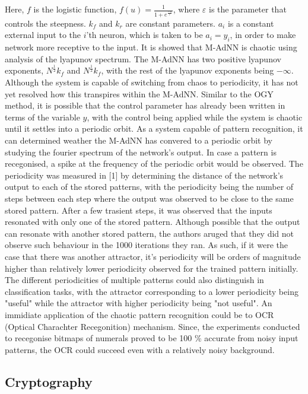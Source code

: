 \documentclass[12pt, letterpaper]{article}
\begin{document}
Here, $f$ is the logistic function, $f(u) = \frac{1}{1 + e^\frac{-u}{\varepsilon}}$, where $\varepsilon$ is the parameter that controls the steepness. $k_f$ and $k_r$ are constant parameters. $a_i$ is a constant external input to the $i$'th neuron, which is taken to be $a_i = y_i$, in order to make network more receptive to the input.
It is showed that M-AdNN is chaotic using analysis of the lyapunov spectrum. The M-AdNN has two positive lyapunov exponents, $N^{\frac{1}{2}}k_f$ and $N^{\frac{1}{2}}k_f$, with the rest of the lyapunov exponents being $-\infty$. Although the system is capable of switching from chaos to periodicity, it has not yet resolved how this transpires within the M-AdNN. Similar to the OGY method, it is possible that the control parameter has already been written in terms of the variable $y$, with the control being applied while the system is chaotic until it settles into a periodic orbit. As a system capable of pattern recognition, it can determined weather the M-AdNN has convered to a periodic orbit by studying the fourier spectrum of the network's output. In case a pattern is recegonised, a spike at the frequency of the periodic orbit would be observed. The periodicity was measured in [1] by determining the distance of the network's output to each of the stored patterns, with the periodicity being the number of steps between each step where the output was observed to be close to the same stored pattern. After a few trasient steps, it was observed that the inputs resonated with only one of the stored pattern. Although possible that the output can resonate with another stored pattern, the authors aruged that they did not observe such behaviour in the 1000 iterations they ran. As such, if it were the case that there was another attractor, it's periodicity will be orders of magnitude higher than relatively lower periodicity observed for the trained pattern initially. The different periodicities of multiple patterns could also distinguish in classification tasks, with the attractor corresponding to a lower periodicity being "useful" while the attractor with higher periodicity being "not useful". An immidiate application of the chaotic pattern recognition could be to OCR (Optical Charachter Recegonition) mechanism. Since, the experiments conducted to recegonise bitmaps of numerals proved to be 100 \% accurate from noisy input patterns, the OCR could succeed even with a relatively noisy background.


\subsection*{Cryptography}
\end{document}
